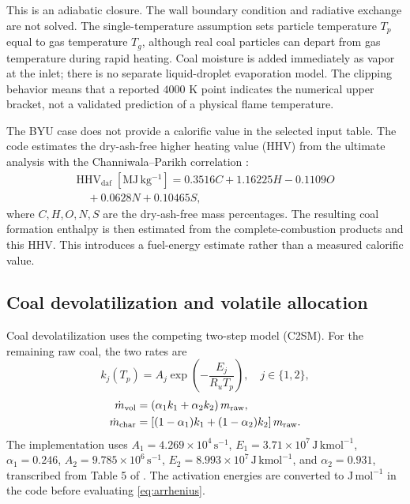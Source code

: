 \documentclass[journal]{IEEEtran}
\newcommand{\daf}{\mathrm{daf}}
\begin{document}
This is an adiabatic closure. The wall boundary condition and radiative exchange are not solved. The single-temperature assumption sets particle temperature \(T_p\) equal to gas temperature \(T_g\), although real coal particles can depart from gas temperature during rapid heating. Coal moisture is added immediately as vapor at the inlet; there is no separate liquid-droplet evaporation model. The clipping behavior means that a reported \(4000\) K point indicates the numerical upper bracket, not a validated prediction of a physical flame temperature.

The BYU case does not provide a calorific value in the selected input table. The code estimates the dry-ash-free higher heating value (HHV) from the ultimate analysis with the Channiwala--Parikh correlation \cite{channiwala2002}:
\begin{equation}
\begin{split}
\mathrm{HHV}_{\daf}\;[\mathrm{MJ\,kg^{-1}}]
=0.3516C+1.16225H-0.1109O\\
\quad+0.0628N+0.10465S,
\end{split}
\label{eq:hhv}
\end{equation}
where \(C,H,O,N,S\) are the dry-ash-free mass percentages. The resulting coal formation enthalpy is then estimated from the complete-combustion products and this HHV. This introduces a fuel-energy estimate rather than a measured calorific value.

\subsection{Coal devolatilization and volatile allocation}
Coal devolatilization uses the competing two-step model (C2SM). For the remaining raw coal, the two rates are
\begin{equation}
k_j(T_p)=A_j\exp\left(-\frac{E_j}{R_uT_p}\right),\quad j\in\{1,2\},
\label{eq:arrhenius}
\end{equation}
\begin{align}
\dot{m}_{\rm vol} &= \left(\alpha_1k_1+\alpha_2k_2\right)m_{\rm raw},\\
\dot{m}_{\rm char} &= \left[(1-\alpha_1)k_1+(1-\alpha_2)k_2\right]m_{\rm raw}.
\end{align}
The implementation uses \(A_1=4.269\times10^4\,\mathrm{s^{-1}}\), \(E_1=3.71\times10^7\,\mathrm{J\,kmol^{-1}}\), \(\alpha_1=0.246\), \(A_2=9.785\times10^6\,\mathrm{s^{-1}}\), \(E_2=8.993\times10^7\,\mathrm{J\,kmol^{-1}}\), and \(\alpha_2=0.931\), transcribed from Table 5 of \cite{mularski2021}. The activation energies are converted to \(\mathrm{J\,mol^{-1}}\) in the code before evaluating \eqref{eq:arrhenius}.
\end{document}
